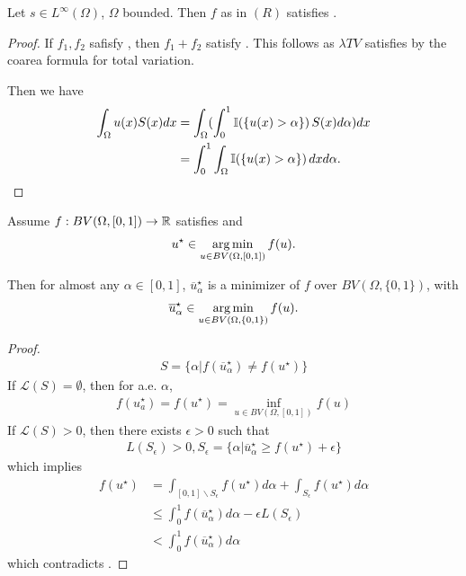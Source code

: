\begin{proposition}
  Let $s \in L^{\infty}(\Omega)$, $\Omega$ bounded.  Then $f$ as in
  $(R)$ satisfies \gcc.
\end{proposition}

\begin{proof}
  If $f_{1}, f_{2}$ safisfy \gcc, then $f_{1} + f_{2}$ satisfy \gcc.
  This follows as $\lambda TV$ satisfies \gcc by the coarea formula for
  total variation.

  Then we have
  \begin{align}
    \label{eq:119}
    \int_{\Omega} u(x) S(x) dx &= \int_{\Omega} (\int_{0}^{1} \I{\{
      u(x) > \alpha \}} S(x) d\alpha) dx \\
    &= \int_{0}^{1} \int_{\Omega} \I{\{ u(x) > \alpha \}} dx d \alpha.
  \end{align}
\end{proof}

\begin{thm}
  \label{defn:relaxation:4}
  Assume $f: BV(\Omega, [0, 1]) \rightarrow \mathbb{R}$ satisfies \gcc and
  \begin{align}
    \label{eq:130}
      u^{\star} \in \operatorname*{arg\,min}_{u \in BV(\Omega, [0, 1])} f(u).
  \end{align}

  Then for almost any $\alpha \in [0, 1]$, $\overline
  u^{\star}_{\alpha}$ is a minimizer of $f$ over $BV(\Omega, \{ 0, 1
  \})$, with 
  \begin{align}
    \label{eq:129}
    \overline u^{\star}_{\alpha} \in \operatorname*{arg\,min}_{u \in BV(\Omega, \{ 0, 1
      \})} f(u).
  \end{align}
\end{thm}

\begin{proof}
  \begin{align}
    \label{eq:120}
    S = \{ \alpha | f(\overline u^{\star}_{\alpha}) \neq f(u^{\star}) \}
  \end{align}  If $\mathcal{L}(S) = \emptyset$, then for a.e.
  $\alpha$,
  \begin{align}
    \label{eq:121}
    f(u^{\star}_{a}) = f(u^{\star}) = \inf_{u \in BV(\Omega, [0, 1])} f(u)
  \end{align}
  If $\mathcal{L}(S) > 0$, then there exists $\epsilon > 0$ such that
  \begin{align}
    \label{eq:122}
    L(S_{\epsilon}) > 0, S_{\epsilon} = \{ \alpha | \overline
    u_{\alpha}^{\star} \geq f(u^{\star}) + \epsilon \}
  \end{align} which implies
  \begin{align}
    \label{eq:123}
    f(u^{\star}) &= \int_{[0, 1] \backslash S_{\epsilon}} f(u^{\star})
    d\alpha + \int_{S_{\epsilon}} f(u^{\star}) d\alpha  \\
    &\leq \int_{0}^{1} f(\overline u^{\star}_{\alpha}) d\alpha -
    \epsilon L(S_{\epsilon}) \\
    &< \int_{0}^{1} f(\overline u_{\alpha}^{\star}) d \alpha
  \end{align} which contradicts \gcc.
\end{proof}

